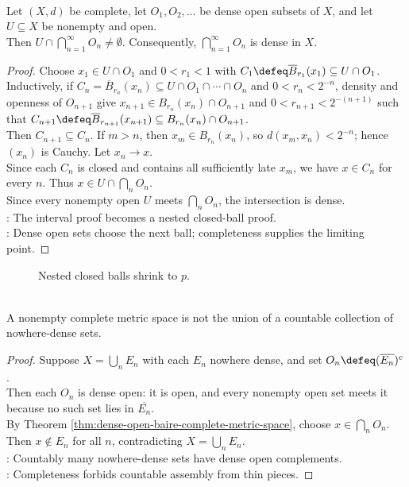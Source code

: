 \begin{theorem} \label{thm:dense-open-baire-complete-metric-space} \\
Let $(X,d)$ be complete, let $O_1,O_2,\ldots$ be dense open subsets of $X$, and let $U\subseteq X$ be nonempty and open.\\
Then $U\cap\bigcap\limits_{n=1}^{\infty}O_n\neq\emptyset$. Consequently, $\bigcap\limits_{n=1}^{\infty}O_n$ is dense in $X$.
\begin{proof}
Choose $x_1\in U\cap O_1$ and $0<r_1<1$ with $C_1\defeq\overline{B}_{r_1}(x_1)\subseteq U\cap O_1$.\\
Inductively, if $C_n=\overline{B}_{r_n}(x_n)\subseteq U\cap O_1\cap\cdots\cap O_n$ and $0<r_n<2^{-n}$, density and openness of $O_{n+1}$ give $x_{n+1}\in B_{r_n}(x_n)\cap O_{n+1}$ and $0<r_{n+1}<2^{-(n+1)}$ such that $C_{n+1}\defeq\overline{B}_{r_{n+1}}(x_{n+1})\subseteq B_{r_n}(x_n)\cap O_{n+1}$.\\
Then $C_{n+1}\subseteq C_n$. If $m>n$, then $x_m\in B_{r_n}(x_n)$, so $d(x_m,x_n)<2^{-n}$; hence $(x_n)$ is Cauchy. Let $x_n\to x$.\\
Since each $C_n$ is closed and contains all sufficiently late $x_m$, we have $x\in C_n$ for every $n$. Thus $x\in U\cap\bigcap_nO_n$.\\
Since every nonempty open $U$ meets $\bigcap_nO_n$, the intersection is dense.\\
: The interval proof becomes a nested closed-ball proof.\\
: Dense open sets choose the next ball; completeness supplies the limiting point.
\end{proof}
\end{theorem}

\begin{figure}[H]
  \centering
  
  \caption{Nested closed balls shrink to \(p\).}
  \label{fig:baire-nested-closed-balls}
\end{figure}

\begin{theorem} \label{thm:baire-category-complete-metric-space} \\
A nonempty complete metric space is not the union of a countable collection of nowhere-dense sets.
\begin{proof}
Suppose $X=\bigcup_nE_n$ with each $E_n$ nowhere dense, and set $O_n\defeq(\overline{E_n})^c$.\\
Then each $O_n$ is dense open: it is open, and every nonempty open set meets it because no such set lies in $\overline{E_n}$.\\
By Theorem \ref{thm:dense-open-baire-complete-metric-space}, choose $x\in\bigcap_nO_n$. Then $x\notin E_n$ for all $n$, contradicting $X=\bigcup_nE_n$.\\
: Countably many nowhere-dense sets have dense open complements.\\
: Completeness forbids countable assembly from thin pieces.
\end{proof}
\end{theorem}

